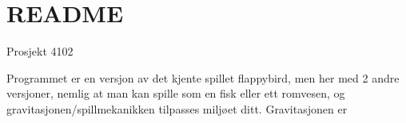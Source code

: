 \chapter{README}
\label{md__r_e_a_d_m_e}
Prosjekt 4102

Programmet er en versjon av det kjente spillet flappybird, men her med 2 andre versjoner, nemlig at man kan spille som en fisk eller ett romvesen, og gravitasjonen/spillmekanikken tilpasses miljøet ditt. Gravitasjonen er 